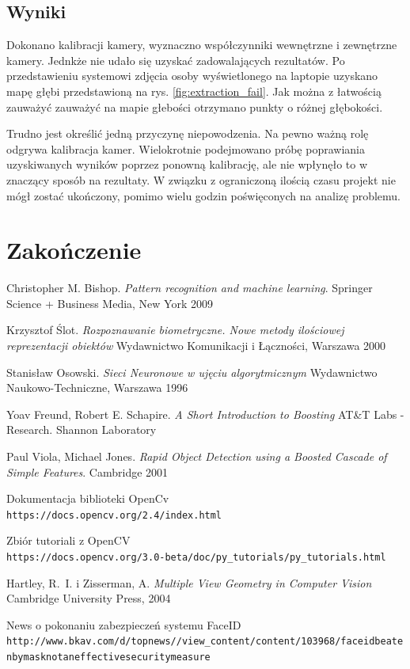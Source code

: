 \documentclass{article}
\begin{document}
\subsection{Wyniki}
Dokonano kalibracji kamery, wyznaczno współczynniki wewnętrzne i zewnętrzne kamery. Jednkże nie udało się uzyskać zadowalających rezultatów. Po przedstawieniu systemowi zdjęcia osoby wyświetlonego na laptopie uzyskano mapę głębi przedstawioną na rys. \ref{fig:extraction_fail}. Jak można z łatwością zauważyć zauważyć na mapie głebości otrzymano punkty o różnej głębokości.

Trudno jest określić jedną przyczynę niepowodzenia. Na pewno ważną rolę odgrywa kalibracja kamer. Wielokrotnie podejmowano próbę poprawiania uzyskiwanych wyników poprzez ponowną kalibrację, ale nie wpłynęło to w znaczący sposób na rezultaty. W związku z ograniczoną ilością czasu projekt nie mógł zostać ukończony, pomimo wielu godzin poświęconych na analizę problemu.

\section{Zakończenie}

\newpage
\begin{thebibliography}{9}

Christopher M. Bishop.
\textit{Pattern recognition and machine learning}.
Springer Science + Business Media, New York 2009

Krzysztof Ślot.
\textit{Rozpoznawanie biometryczne. Nowe metody ilościowej reprezentacji obiektów}
Wydawnictwo Komunikacji i Łączności, Warszawa 2000

Stanisław Osowski.
\textit{Sieci Neuronowe w ujęciu algorytmicznym}
Wydawnictwo Naukowo-Techniczne, Warszawa 1996

Yoav Freund, Robert E. Schapire.
\textit{A Short Introduction to Boosting}
AT\&T Labs - Research. Shannon Laboratory

Paul Viola, Michael Jones.
\textit{Rapid Object Detection using a Boosted Cascade of Simple Features}.
Cambridge 2001

Dokumentacja biblioteki OpenCv 
\\\texttt{https://docs.opencv.org/2.4/index.html}

Zbiór tutoriali z OpenCV
\\\texttt{https://docs.opencv.org/3.0-beta/doc/py\_tutorials/py\_tutorials.html}

Hartley, R.~I. i Zisserman, A.
\textit{Multiple View Geometry in Computer Vision}
Cambridge University Press, 2004


News o pokonaniu zabezpieczeń systemu FaceID
\\\texttt{http://www.bkav.com/d/top\-news/\-/view\_content/content/103968/face\-id\-beaten\-by\-mask\-not\-an\-effective\-security\-measure}

\end{thebibliography}
\end{document}

